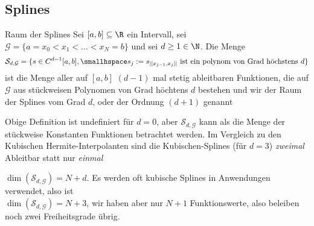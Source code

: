 \newsectionNoPB
\subsection{Splines}
\begin{definition}[]{Raum der Splines}
    Sei $[a, b] \subseteq \R$ ein Intervall, sei $\mathcal{G} = \{ a = x_0 < x_1 < \ldots < x_N = b \}$ und sei $d \geq 1 \in \N$.
    Die Menge
    \begin{align*}
        \mathcal{S}_{d, \mathcal{G}} = \{ s \in C^{d - 1}[a, b], \smallhspace s_j := s_{|[x_{j - 1}, x_j]|} \text{ ist ein polynom von Grad höchstens } d \}
    \end{align*}
    ist die Menge aller auf $[a, b]$ $(d - 1)$ mal stetig ableitbaren Funktionen, die auf $\mathcal{G}$ aus stückweisen Polynomen von Grad höchtens $d$ bestehen
    und wir der Raum der Splines vom Grad $d$, oder der Ordnung $(d + 1)$ genannt
\end{definition}

\inlineremark Obige Definition ist undefiniert für $d = 0$, aber $\mathcal{S}_{d, \mathcal{G}}$ kann als die Menge der stückweise Konstanten Funktionen betrachtet werden.
Im Vergleich zu den Kubischen Hermite-Interpolanten sind die Kubischen-Splines (für $d = 3$) \textit{zweimal} Ableitbar statt nur \textit{einmal}

\inlineremark $\dim(\mathcal{S}_{d, \mathcal{G}}) = N + d$. Es werden oft kubische Splines in Anwendungen verwendet, also ist\\
$\dim(\mathcal{S}_{d, \mathcal{G}}) = N + 3$, wir haben aber nur $N + 1$ Funktionswerte, also beleiben noch zwei Freiheitsgrade übrig.

